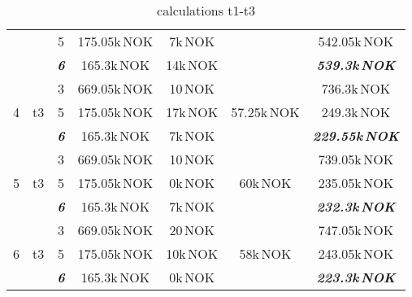 \documentclass{article}
\begin{document}
\begin{table}[hbt!]
\begin{center}
\begin{tabular}[h]{|c|c|c||c|c|c||c|}
&	&	5		&		175.05k\,NOK	&	7k\,NOK			&										&	542.05k\,NOK\\
&	&	\textit{\textbf{6}}		&		165.3k\,NOK		&	14k\,NOK		&					&	\textit{\textbf{539.3k\,NOK}}\\
\hline
\multirow{3}{*}{4} & \multirow{3}{*}{t3}	
	&	3		&		669.05k\,NOK	&	10\,NOK			&	\multirow{3}{*}{57.25k\,NOK}		&	736.3k\,NOK\\
&	&	5		&		175.05k\,NOK	&	17k\,NOK		&										&	249.3k\,NOK\\
&	&	\textit{\textbf{6}}		&		165.3k\,NOK		&	7k\,NOK			&					&	\textit{\textbf{229.55k\,NOK}}\\
\hline
\multirow{3}{*}{5} & \multirow{3}{*}{t3}	
	&	3		&		669.05k\,NOK	&	10\,NOK			&	\multirow{3}{*}{60k\,NOK}			&	739.05k\,NOK\\
&	&	5		&		175.05k\,NOK	&	0k\,NOK			&										&	235.05k\,NOK\\
&	&	\textit{\textbf{6}}		&		165.3k\,NOK		&	7k\,NOK			&					&	\textit{\textbf{232.3k\,NOK}}\\
\hline
\multirow{3}{*}{6} & \multirow{3}{*}{t3}	
	&	3		&		669.05k\,NOK	&	20\,NOK			&	\multirow{3}{*}{58k\,NOK}			&	747.05k\,NOK\\
&	&	5		&		175.05k\,NOK	&	10k\,NOK		&										&	243.05k\,NOK\\
&	&	\textit{\textbf{6}}		&		165.3k\,NOK		&	0k\,NOK			&					&	\textit{\textbf{223.3k\,NOK}}\\
\hline
\end{tabular}
\caption{calculations t1-t3}\label{tab:calct13}
\end{center}
\end{table}
\end{document}

